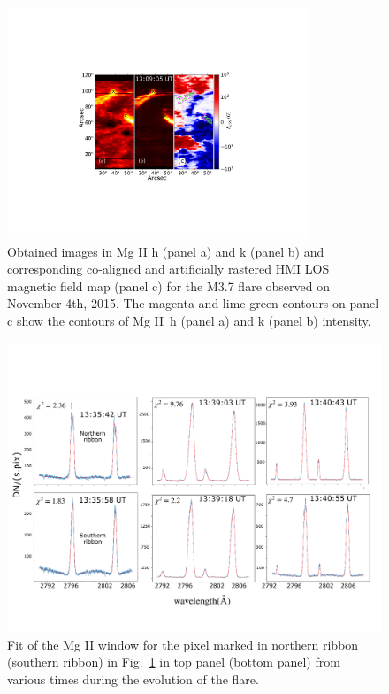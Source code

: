 \begin{figure}[h!]
\centering  
\includegraphics[trim={7cm 5cm 6cm 10cm},width=0.8\textwidth]{Figures/m_flare_iris.pdf}
\caption{Obtained images in Mg II h (panel a) and k (panel b) and corresponding co-aligned and artificially rastered HMI LOS magnetic field map (panel c) for the M3.7 flare observed on November 4th, 2015. The magenta and lime green contours on panel c show the contours of Mg II~h (panel a) and k (panel b) intensity.} \label{fig:aligned_raster}
\end{figure}

\begin{figure}[ht!]
    \centering
    \includegraphics[trim={0cm 3cm 0.5cm 3cm},clip,width=\textwidth]{Figures/pix_fit.pdf}
    \caption{Fit of the Mg II window for the pixel marked in northern ribbon (southern ribbon) in Fig.~\ref{fig:aligned_raster} in top panel (bottom panel) from various times during the evolution of the flare. }
    \label{fig:pix_fit_ribbon}
\end{figure}

